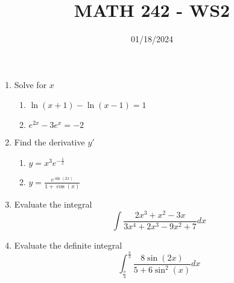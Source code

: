 \documentclass[12pt]{article}
\title{MATH 242 - WS2}
\date{01/18/2024}
\begin{document}
\maketitle


\begin{enumerate}

\item Solve for $x$
\begin{enumerate}
    \item $\ln{(x+1)}-\ln{(x-1)}=1$
    \vfill
    \item $e^{2x}-3e^x=-2$
    \vfill
\end{enumerate}

\item Find the derivative $y'$
\begin{enumerate}
    \item $y=x^3e^{-\frac{1}{x}}$
    \vfill
    \item $y=\frac{e^{\sin(2x)}}{1+\cos(x)}$
    \vfill
\end{enumerate}
\pagebreak

\item Evaluate the integral $$\int\frac{2x^3+x^2-3x}{3x^4+2x^3-9x^2+7}dx$$
\vfill

\item Evaluate the definite integral $$\int_{\frac{\pi}{4}}^{\frac{\pi}{3}}\frac{8\sin(2x)}{5+6\sin^2(x)}dx$$

\vfill

\end{enumerate}
\end{document}
